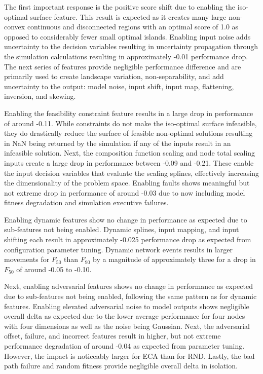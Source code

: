 \documentclass[a4paper]{article}
\begin{document}
The first important response is the positive score shift due to enabling the iso-optimal surface feature. This result is expected as it creates many large non-convex continuous and disconnected regions with an optimal score of 1.0 as opposed to considerably fewer small optimal islands. Enabling input noise adds uncertainty to the decision variables resulting in uncertainty propagation through the simulation calculations resulting in approximately -0.01 performance drop. The next series of features provide negligible performance difference and are primarily used to create landscape variation, non-separability, and add uncertainty to the output: model noise, input shift, input map, flattening, inversion, and skewing.

Enabling the feasibility constraint feature results in a large drop in performance of around -0.11. While constraints do not make the iso-optimal surface infeasible, they do drastically reduce the surface of feasible non-optimal solutions resulting in NaN being returned by the simulation if any of the inputs result in an infeasible solution. Next, the composition function scaling and node total scaling inputs create a large drop in performance between -0.09 and -0.21. These enable the input decision variables that evaluate the scaling splines, effectively increasing the dimensionality of the problem space. Enabling faults shows meaningful but not extreme drop in performance of around -0.03 due to now including model fitness degradation and simulation executive failures.

Enabling dynamic features show no change in performance as expected due to sub-features not being enabled. Dynamic splines, input mapping, and input shifting each result in approximately -0.025 performance drop as expected from configuration parameter tuning. Dynamic network events results in larger movements for $F_{50}$ than $F_{90}$ by a magnitude of approximately three for a drop in $F_{50}$ of around -0.05 to -0.10.

Next, enabling adversarial features shows no change in performance as expected due to sub-features not being enabled, following the same pattern as for dynamic features. Enabling elevated adversarial noise to model outputs shows negligible overall delta as expected due to the lower average performance for four nodes with four dimensions as well as the noise being Gaussian. Next, the adversarial offset, failure, and incorrect features result in higher, but not extreme performance degradation of around -0.04 as expected from parameter tuning. However, the impact is noticeably larger for ECA than for RND. Lastly, the bad path failure and random fitness provide negligible overall delta in isolation.
\end{document}
